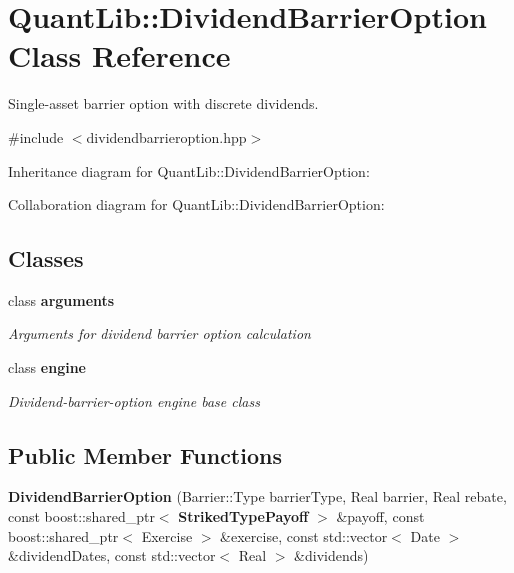 \section{Quant\+Lib\+:\+:Dividend\+Barrier\+Option Class Reference}
\label{class_quant_lib_1_1_dividend_barrier_option}


Single-\/asset barrier option with discrete dividends.  




{\ttfamily \#include $<$dividendbarrieroption.\+hpp$>$}



Inheritance diagram for Quant\+Lib\+:\+:Dividend\+Barrier\+Option\+:


Collaboration diagram for Quant\+Lib\+:\+:Dividend\+Barrier\+Option\+:
\subsection*{Classes}
\begin{DoxyCompactItemize}
\item 
class {\bf arguments}
\begin{DoxyCompactList}\small\item\em Arguments for dividend barrier option calculation \end{DoxyCompactList}\item 
class {\bf engine}
\begin{DoxyCompactList}\small\item\em Dividend-\/barrier-\/option engine base class \end{DoxyCompactList}\end{DoxyCompactItemize}
\subsection*{Public Member Functions}
\begin{DoxyCompactItemize}
\item 
{\bfseries Dividend\+Barrier\+Option} (Barrier\+::\+Type barrier\+Type, Real barrier, Real rebate, const boost\+::shared\+\_\+ptr$<$ {\bf Striked\+Type\+Payoff} $>$ \&payoff, const boost\+::shared\+\_\+ptr$<$ Exercise $>$ \&exercise, const std\+::vector$<$ Date $>$ \&dividend\+Dates, const std\+::vector$<$ Real $>$ \&dividends)\label{class_quant_lib_1_1_dividend_barrier_option_a5e94123a8ac6b40626f862f5d26497e4}

\end{DoxyCompactItemize}
